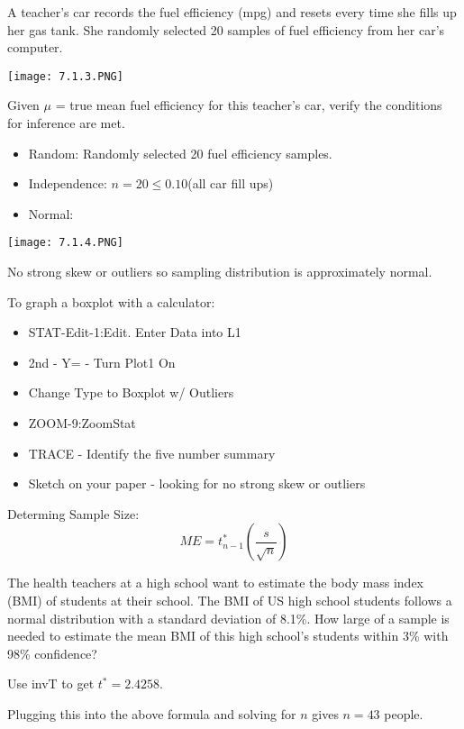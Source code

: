 \documentclass[../stats.tex]{subfiles}
\begin{document}
\begin{example}
    A teacher's car records the fuel efficiency (mpg) and resets every time she fills up her gas tank. She randomly selected 20 samples of fuel efficiency from her car's computer.
    \begin{center}
        \texttt{[image: 7.1.3.PNG]}
    \end{center}
    Given $\mu$ = true mean fuel efficiency for this teacher's car, verify the conditions for inference are met.

    \begin{itemize}
        \item Random: Randomly selected 20 fuel efficiency samples.
        \item Independence: $n=20\leq 0.10$(all car fill ups)
        \item Normal:
    \end{itemize}
    \begin{center}
        \texttt{[image: 7.1.4.PNG]}
    \end{center}
    No strong skew or outliers so sampling distribution is approximately normal.

    To graph a boxplot with a calculator:
    \begin{itemize}
        \item STAT-Edit-1:Edit. Enter Data into L1 
        \item 2nd - Y= - Turn Plot1 On
        \item Change Type to Boxplot w/ Outliers 
        \item ZOOM-9:ZoomStat 
        \item TRACE - Identify the five number summary 
        \item Sketch on your paper - looking for no strong skew or outliers 
    \end{itemize}
\end{example}

Determing Sample Size:
\[ ME = t^{*}_{n-1}\left(\frac{s}{\sqrt{n}}\right) \]

\begin{example}
    The health teachers at a high school want to estimate the body mass index (BMI) of students at their school. The BMI of US high school students follows a normal distribution with a standard deviation of 8.1\%. How large of a sample is needed to estimate the mean BMI of this high school's students within 3\% with 98\% confidence?

    Use invT to get $t^*=2.4258$.

    Plugging this into the above formula and solving for $n$ gives $n=43$ people.
\end{example}
\end{document}
